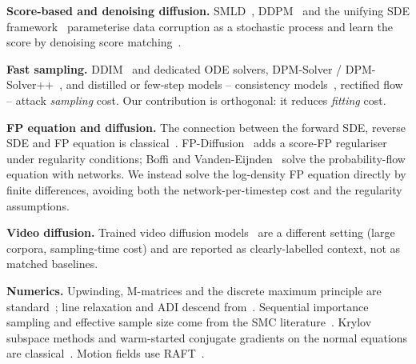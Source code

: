 \noindent\textbf{Score-based and denoising diffusion.} SMLD~\cite{ysong-2019},
DDPM~\cite{ho-2020} and the unifying SDE
framework~\cite{ysong-2020,sohl-dickstein-2015} parameterise data corruption as
a stochastic process and learn the score by denoising score
matching~\cite{hyvarinen-2005,vincent-2011}.

\noindent\textbf{Fast sampling.} DDIM~\cite{jsong-2020} and dedicated ODE
solvers, DPM-Solver / DPM-Solver++~\cite{lu-2022,lu-2022-dpmpp}, and distilled
or few-step models -- consistency models~\cite{song-2023-consistency}, rectified
flow~\cite{liu-2023-rectified} -- attack \emph{sampling} cost. Our contribution
is orthogonal: it reduces \emph{fitting} cost. 

\noindent\textbf{FP equation and diffusion.} The connection between the forward
SDE, reverse SDE and FP equation is classical~\cite{anderson-1982,oksendal-1987}.
FP-Diffusion~\cite{lai-2022} adds a score-FP regulariser under regularity
conditions; Boffi and Vanden-Eijnden~\cite{boffi-2022} solve the probability-flow
equation with networks. We instead solve the log-density FP equation directly by
finite differences, avoiding both the network-per-timestep cost and the
regularity assumptions.

\noindent\textbf{Video diffusion.} Trained video diffusion
models~\cite{ho-2022-video,blattmann-2023-svd} are a different setting (large
corpora, sampling-time cost) and are reported as clearly-labelled context, not as
matched baselines. 

\noindent\textbf{Numerics.} Upwinding, M-matrices and the discrete maximum
principle are standard~\cite{leveque-2007,morton-mayers-2005,varga-2000}; line
relaxation and ADI descend from~\cite{peaceman-rachford-1955}. Sequential
importance sampling and effective sample size come from the SMC
literature~\cite{doucet-2001-smc,kong-1994-ess}. Krylov subspace methods and
warm-started conjugate gradients on the normal equations are
classical~\cite{saad-2003-iterative,hestenes-1952-cg}. Motion fields use
RAFT~\cite{teed-2020-raft}.

